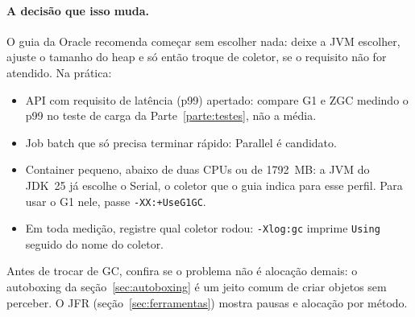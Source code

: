

\paragraph{A decisão que isso muda.}
O guia da Oracle recomenda começar sem escolher nada: deixe a JVM
escolher, ajuste o tamanho do heap e só então troque de coletor, se o
requisito não for atendido. Na prática:
\begin{itemize}
\item API com requisito de latência (p99) apertado: compare G1 e ZGC
  medindo o p99 no teste de carga da Parte~\ref{parte:testes}, não a média.
\item Job batch que só precisa terminar rápido: Parallel é candidato.
\item Container pequeno, abaixo de duas CPUs ou de 1792~MB: a JVM do
  JDK~25 já escolhe o Serial, o coletor que o guia indica para esse
  perfil. Para usar o G1 nele, passe \texttt{-XX:+UseG1GC}.
\item Em toda medição, registre qual coletor rodou: \texttt{-Xlog:gc}
  imprime \texttt{Using} seguido do nome do coletor.
\end{itemize}
Antes de trocar de GC, confira se o problema não é alocação demais: o
autoboxing da seção~\ref{sec:autoboxing} é um jeito comum de criar
objetos sem perceber. O JFR (seção~\ref{sec:ferramentas}) mostra pausas
e alocação por método.
